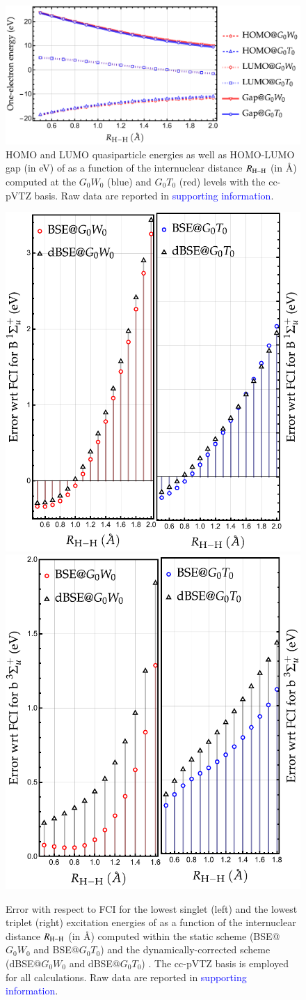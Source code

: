 \documentclass[aip,jcp,reprint,noshowkeys,superscriptaddress]{revtex4-1}
\newcommand{\SupInf}{\textcolor{blue}{supporting information}}
\begin{document}
\begin{figure}
	\includegraphics[width=\linewidth]{H2_gap}
	\caption{HOMO and LUMO quasiparticle energies as well as HOMO-LUMO gap (in \si{\eV}) of  as a function of the internuclear distance $R_{\ce{H-H}}$ (in \si{\angstrom}) computed at the $G_0W_0$ (blue) and $G_0T_0$ (red) levels with the cc-pVTZ basis.
	Raw data are reported in {\SupInf}.}
	\label{fig:H2_gap}
\end{figure}

\begin{figure}
	\includegraphics[width=0.4\linewidth]{H2_dBSE1}
	\hspace{0.1\linewidth}
	\includegraphics[width=0.4\linewidth]{H2_dBSE3}
	\caption{
	Error with respect to FCI for the lowest singlet (left) and the lowest triplet (right) excitation energies of  as a function of the internuclear distance $R_{\ce{H-H}}$ (in \si{\angstrom}) computed within the static scheme (BSE@$G_0W_0$ and BSE@$G_0T_0$) and the dynamically-corrected scheme (dBSE@$G_0W_0$ and dBSE@$G_0T_0$) .
	The cc-pVTZ basis is employed for all calculations.
	Raw data are reported in {\SupInf}.}
	\label{fig:H2_dBSE}
\end{figure}
\end{document}
